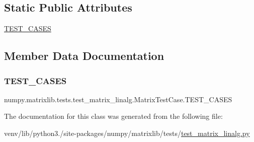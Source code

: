 \subsection*{Static Public Attributes}
\begin{DoxyCompactItemize}
\item 
\hyperlink{classnumpy_1_1matrixlib_1_1tests_1_1test__matrix__linalg_1_1MatrixTestCase_a649be4e9bc99b7505a59ab043e902df9}{T\+E\+S\+T\+\_\+\+C\+A\+S\+ES}
\end{DoxyCompactItemize}


\subsection{Member Data Documentation}
\mbox{\label{classnumpy_1_1matrixlib_1_1tests_1_1test__matrix__linalg_1_1MatrixTestCase_a649be4e9bc99b7505a59ab043e902df9}} 
\subsubsection{\texorpdfstring{T\+E\+S\+T\+\_\+\+C\+A\+S\+ES}{TEST\_CASES}}
{\footnotesize\ttfamily numpy.\+matrixlib.\+tests.\+test\+\_\+matrix\+\_\+linalg.\+Matrix\+Test\+Case.\+T\+E\+S\+T\+\_\+\+C\+A\+S\+ES\hspace{0.3cm}{\ttfamily [static]}}



The documentation for this class was generated from the following file\+:\begin{DoxyCompactItemize}
\item 
venv/lib/python3./site-\/packages/numpy/matrixlib/tests/\hyperlink{test__matrix__linalg_8py}{test\+\_\+matrix\+\_\+linalg.\+py}\end{DoxyCompactItemize}
